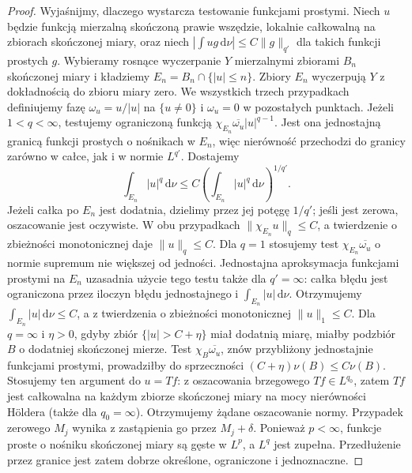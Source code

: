 \begin{proof}
Wyjaśnijmy, dlaczego wystarcza testowanie funkcjami
prostymi. Niech $u$ będzie funkcją mierzalną skończoną
prawie wszędzie, lokalnie całkowalną na zbiorach
skończonej miary, oraz niech
$|\int ug\,\mathrm d\nu|\le C\|g\|_{q'}$ dla takich
funkcji prostych $g$. Wybieramy rosnące wyczerpanie $Y$ mierzalnymi
zbiorami $B_n$ skończonej miary i kładziemy
$E_n=B_n\cap\{|u|\le n\}$. Zbiory $E_n$ wyczerpują
$Y$ z dokładnością do zbioru miary zero.
We wszystkich trzech przypadkach definiujemy fazę
$\omega_u=u/|u|$ na $\{u\ne0\}$ i $\omega_u=0$
w pozostałych punktach.
Jeżeli $1<q<\infty$, testujemy ograniczoną funkcją
$\chi_{E_n}\overline{\omega_u}|u|^{q-1}$. Jest ona jednostajną granicą funkcji prostych
o nośnikach w $E_n$, więc nierówność przechodzi do
granicy zarówno w całce, jak i w normie $L^{q'}$.
Dostajemy
\[
 \int_{E_n}|u|^q\,\mathrm d\nu
 \le C\left(\int_{E_n}|u|^q\,\mathrm d\nu\right)^{1/q'}.
\]
Jeżeli całka po $E_n$ jest dodatnia, dzielimy
przez jej potęgę $1/q'$; jeśli jest zerowa, oszacowanie
jest oczywiste. W obu przypadkach
$\|\chi_{E_n}u\|_q\le C$, a twierdzenie
o zbieżności monotonicznej daje $\|u\|_q\le C$.
Dla $q=1$ stosujemy test $\chi_{E_n}\overline{\omega_u}$
o normie supremum nie większej od jedności.
Jednostajna aproksymacja funkcjami prostymi na $E_n$
uzasadnia użycie tego testu także dla $q'=\infty$:
całka błędu jest ograniczona przez iloczyn błędu
jednostajnego i $\int_{E_n}|u|\,\mathrm d\nu$.
Otrzymujemy $\int_{E_n}|u|\,\mathrm d\nu\le C$,
a z twierdzenia o zbieżności monotonicznej
$\|u\|_1\le C$.
Dla $q=\infty$ i $\eta>0$, gdyby zbiór
$\{|u|>C+\eta\}$ miał dodatnią miarę, miałby podzbiór
$B$ o dodatniej skończonej mierze. Test
$\chi_B\overline{\omega_u}$, znów przybliżony jednostajnie
funkcjami prostymi, prowadziłby do sprzeczności
$(C+\eta)\nu(B)\le C\nu(B)$.
Stosujemy ten argument do $u=Tf$: z oszacowania
brzegowego $Tf\in L^{q_0}$, zatem $Tf$ jest
całkowalna na każdym zbiorze skończonej miary
na mocy nierówności Höldera (także dla $q_0=\infty$).
Otrzymujemy żądane oszacowanie normy. Przypadek zerowego $M_j$ wynika
z zastąpienia go przez $M_j+\delta$.
Ponieważ $p<\infty$, funkcje proste o nośniku skończonej
miary są gęste w $L^p$, a $L^q$ jest zupełna.
Przedłużenie przez granice jest zatem dobrze określone,
ograniczone i jednoznaczne.
\end{proof}

